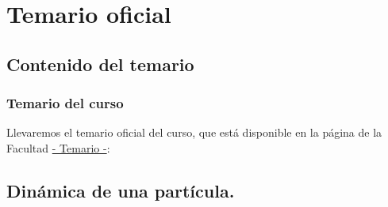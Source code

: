 \documentclass[12pt]{beamer}
\begin{document}
\section{Temario oficial}
\subsection{Contenido del temario}

\begin{frame}
\frametitle{Temario del curso}
Llevaremos el temario oficial del curso, que está disponible en la página de la Facultad \href{https://www.fciencias.unam.mx/sites/default/files/temario/611.pdf}{- Temario -}:
\end{frame}

\subsection{Dinámica de una partícula.}
\end{document}
